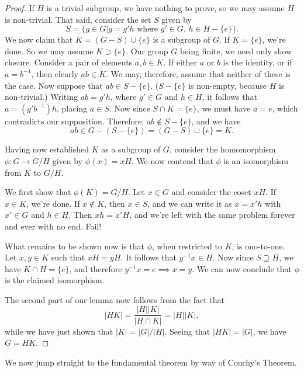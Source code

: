 \documentclass[12pt]{article}
\begin{document}
\begin{proof}
If $H$ is a trivial subgroup, we have nothing to prove,
so we may assume $H$ is non-trivial.  That said, consider
the set $S$ given by
\begin{equation*}
S = \{g\in G|\mbox{$g=g'h$ where $g'\in G$, $h\in H-\{e\}$}\}.
\end{equation*}
We now claim that $K=(G-S)\cup\{e\}$ is a subgroup of $G$.
If $K=\{e\}$, we're done.  So we may assume $K\supset\{e\}$. Our group $G$ being finite, we
need only show closure.  Consider a pair of elements $a,b\in K$.
If either $a$ or $b$ is the identity, or if $a=b^{-1}$, then clearly $ab\in K$.
We may, therefore, assume that neither of these is the case.
Now suppose that $ab\in S-\{e\}$.  ($S-\{e\}$ is non-empty, because $H$ is non-trivial.)
Writing $ab=g'h$, where $g'\in G$ and $h\in H$,
it follows that $a=(g'b^{-1})h$, placing $a\in S$.  Now since $S\cap K=\{e\}$,
we must have $a=e$, which contradicts our supposition.
Therefore, $ab\not\in S-\{e\}$, and we have
\begin{equation*}
ab\in G-(S-\{e\})=(G-S)\cup\{e\}=K.
\end{equation*}

Having now established $K$ as a subgroup of $G$, consider the homomorphism
$\phi:G\to G/H$ given by $\phi(x)=xH$.  We now contend that $\phi$ is an
isomorphism from $K$ to $G/H$.

We first show that $\phi(K)=G/H$.  Let $x\in G$ and consider the
coset $xH$.  If $x\in K$, we're done.  If $x\not\in K$, then $x\in S$,
and we can write it as $x=x'h$ with $x'\in G$ and $h\in H$.
Then $xh=x'H$, and we're left with the same problem forever and ever with no end.
Fail!

What remains to be shown now is that $\phi$, when restricted to $K$,
is ono-to-one.  Let $x,y\in K$ such that $xH=yH$.
It follows that $y^{-1}x\in H$.  Now since $S\supseteq H$, we have $K\cap H=\{e\}$,
and therefore $y^{-1}x=e\implies x=y$.  We can now conclude that $\phi$
is the claimed isomorphism.

The second part of our lemma now follows from the fact that
\begin{equation*}
|HK|=\frac{|H||K|}{|H\cap K|}=|H||K|,
\end{equation*}
while we have just shown that $|K|=|G|/|H|$.
Seeing that $|HK|=|G|$, we have $G=HK$.
\end{proof}

We now jump straight to the fundamental theorem by way of Couchy's Theorem.
\end{document}

